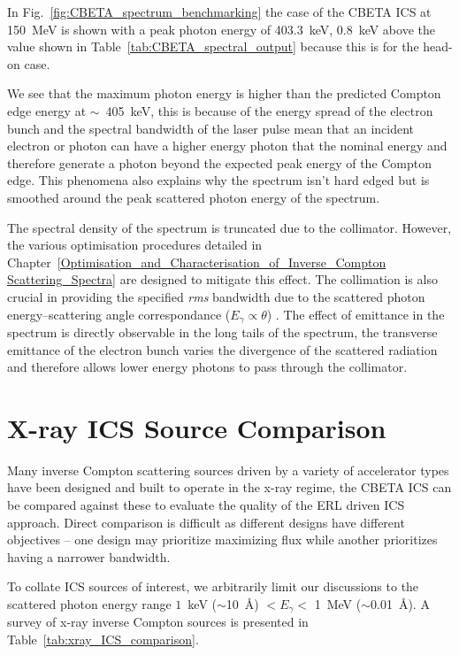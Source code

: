 \documentclass[../main.tex]{subfiles}
\begin{document}
In Fig.~\ref{fig:CBETA_spectrum_benchmarking} the case of the CBETA ICS at 150~\si{\mega\electronvolt} is shown with a peak photon energy of 403.3~\si{\kilo\electronvolt}, 0.8~\si{\kilo\electronvolt} above the value shown in Table~\ref{tab:CBETA_spectral_output} because this is for the head-on case. 

We see that the maximum photon energy is higher than the predicted Compton edge energy at $\sim$~405~\si{\kilo\electronvolt}, this is because of the energy spread of the electron bunch and the spectral bandwidth of the laser pulse mean that an incident electron or photon can have a higher energy photon that the nominal energy and therefore generate a photon beyond the expected peak energy of the Compton edge. This phenomena also explains why the spectrum isn't hard edged but is smoothed around the peak scattered photon energy of the spectrum. 

The spectral density of the spectrum is truncated due to the collimator. However, the various optimisation procedures detailed in Chapter~\ref{Optimisation_and_Characterisation_of_Inverse_Compton Scattering_Spectra} are designed to mitigate this effect. The collimation is also crucial in providing the specified \textit{rms} bandwidth due to the scattered photon energy--scattering angle correspondance ($E_{\gamma}\propto\theta$) . The effect of emittance in the spectrum is directly observable in the long tails of the spectrum, the transverse emittance of the electron bunch varies the divergence of the scattered radiation and therefore allows lower energy photons to pass through the collimator. 

\section{X-ray ICS Source Comparison}
\label{sec:xray_ICS_comparison}

Many inverse Compton scattering sources driven by a variety of accelerator types have been designed and built to operate in the x-ray regime, the CBETA ICS can be compared against these to evaluate the quality of the ERL driven ICS approach. Direct comparison is difficult as different designs have different objectives -- one design may prioritize maximizing flux while another prioritizes having a narrower bandwidth.

To collate ICS sources of interest, we arbitrarily limit our discussions to the scattered photon energy range $1$~\si{\kilo\electronvolt} ($\sim$10~\si{\angstrom}) $< E_{\gamma} <$ 1~\si{\mega\electronvolt} ($\sim$0.01~\si{\angstrom}). A survey of x-ray inverse Compton sources is presented in Table~\ref{tab:xray_ICS_comparison}.
\end{document}
